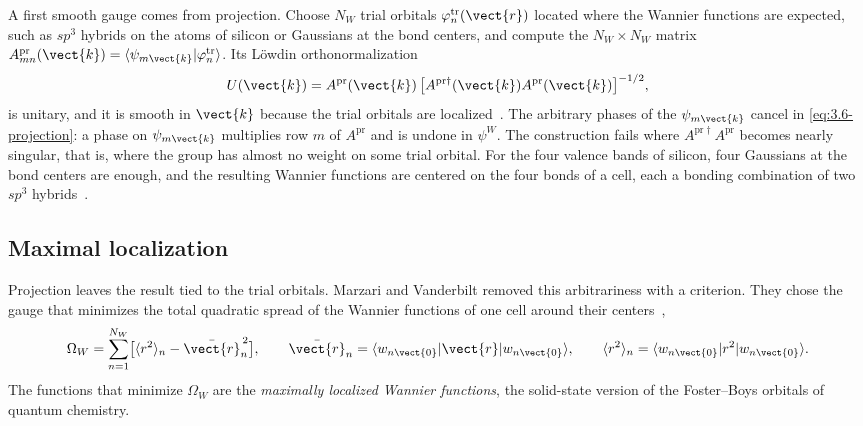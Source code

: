 A first smooth gauge comes from projection. Choose $N_W$ trial orbitals $\varphi^{\mathrm{tr}}_n(\vect{r})$ located where the Wannier functions are expected, such as $sp^3$ hybrids on the atoms of silicon or Gaussians at the bond centers, and compute the $N_W\times N_W$ matrix $A^{\mathrm{pr}}_{mn}(\vect{k}) = \langle\psi_{m\vect{k}}|\varphi^{\mathrm{tr}}_n\rangle$. Its L\"owdin orthonormalization
\begin{equation}
  U(\vect{k}) = A^{\mathrm{pr}}(\vect{k})\,\bigl[A^{\mathrm{pr}\dagger}(\vect{k})A^{\mathrm{pr}}(\vect{k})\bigr]^{-1/2} ,
  \label{eq:3.6-projection}
\end{equation}
is unitary, and it is smooth in $\vect{k}$ because the trial orbitals are localized~\cite[Eqs.~(16) and (17)]{marzari2012maximally}. The arbitrary phases of the $\psi_{m\vect{k}}$ cancel in \cref{eq:3.6-projection}: a phase on $\psi_{m\vect{k}}$ multiplies row $m$ of $A^{\mathrm{pr}}$ and is undone in $\psi^W$. The construction fails where $A^{\mathrm{pr}\dagger}A^{\mathrm{pr}}$ becomes nearly singular, that is, where the group has almost no weight on some trial orbital. For the four valence bands of silicon, four Gaussians at the bond centers are enough, and the resulting Wannier functions are centered on the four bonds of a cell, each a bonding combination of two $sp^3$ hybrids~\cite[Fig.~2]{marzari2012maximally}.

\subsection{Maximal localization}

Projection leaves the result tied to the trial orbitals. Marzari and Vanderbilt removed this arbitrariness with a criterion. They chose the gauge that minimizes the total quadratic spread of the Wannier functions of one cell around their centers~\cite[Eq.~(11)]{marzari1997maximally},
\begin{equation}
  \Omega_W = \sum_{n=1}^{N_W}\bigl[\langle r^2\rangle_n - \bar{\vect{r}}_n^{\,2}\bigr], \qquad
  \bar{\vect{r}}_n = \langle w_{n\vect{0}}|\vect{r}|w_{n\vect{0}}\rangle, \qquad
  \langle r^2\rangle_n = \langle w_{n\vect{0}}|r^2|w_{n\vect{0}}\rangle .
  \label{eq:3.6-spread}
\end{equation}
The functions that minimize $\Omega_W$ are the \emph{maximally localized Wannier functions}, the solid-state version of the Foster--Boys orbitals of quantum chemistry.

